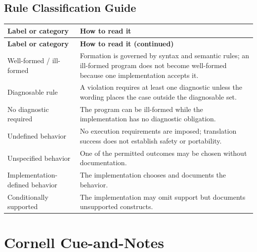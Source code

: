 \documentclass[11pt,letterpaper]{article}
\begin{document}
\subsection*{Rule Classification Guide}
\small\begin{longtable}{@{}>{\RaggedRight\arraybackslash}p{}>{\RaggedRight\arraybackslash}p{}@{}}\toprule\textbf{Label or category} & \textbf{How to read it}\\\midrule\endfirsthead\toprule\textbf{Label or category} & \textbf{How to read it (continued)}\\\midrule\endhead\bottomrule\endfoot
Well-formed / ill-formed & Formation is governed by syntax and semantic rules; an ill-formed program does not become well-formed because one implementation accepts it.\\
Diagnosable rule & A violation requires at least one diagnostic unless the wording places the case outside the diagnosable set.\\
No diagnostic required & The program can be ill-formed while the implementation has no diagnostic obligation.\\
Undefined behavior & No execution requirements are imposed; translation success does not establish safety or portability.\\
Unspecified behavior & One of the permitted outcomes may be chosen without documentation.\\
Implementation-defined behavior & The implementation chooses and documents the behavior.\\
Conditionally supported & The implementation may omit support but documents unsupported constructs.\\
\end{longtable}\normalsize
\section{Cornell Cue-and-Notes}
\end{document}
